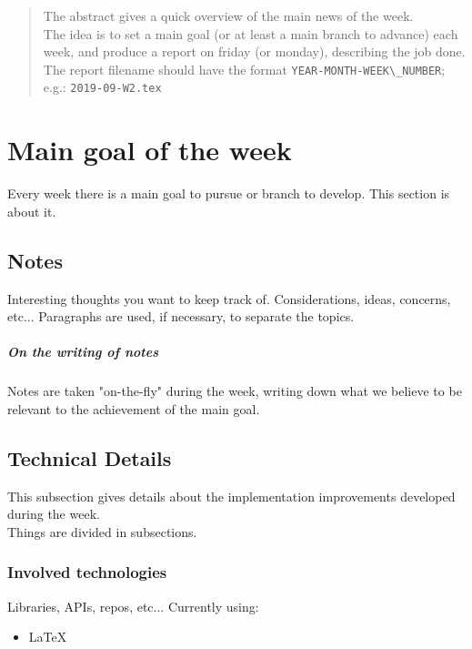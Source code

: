 


\maketitle
	
\begin{abstract}
The abstract gives a quick overview of the main news of the week.\\
The idea is to set a main goal (or at least a main branch to advance) each week,
and produce a report on friday (or monday), describing the job done.\\
The report filename should have the format \verb|YEAR-MONTH-WEEK\_NUMBER|; e.g.: \verb|2019-09-W2.tex|
\end{abstract}

\chapter{Main goal of the week} %
Every week there is a main goal to pursue or branch to develop.
This section is about it.
\section{Notes}
Interesting thoughts you want to keep track of.
Considerations, ideas, concerns, etc...
Paragraphs are used, if necessary, to separate the topics.
\paragraph{On the writing of notes}
Notes are taken "on-the-fly" during the week, writing down what we believe to be relevant to the achievement of the main goal.
\section{Technical Details}
This subsection gives details about the implementation improvements developed during the week.\\
%
Things are divided in subsections.
\subsection{Involved technologies}
Libraries, APIs, repos, etc...
Currently using:
\begin{itemize}
  \item LaTeX
\end{itemize}

